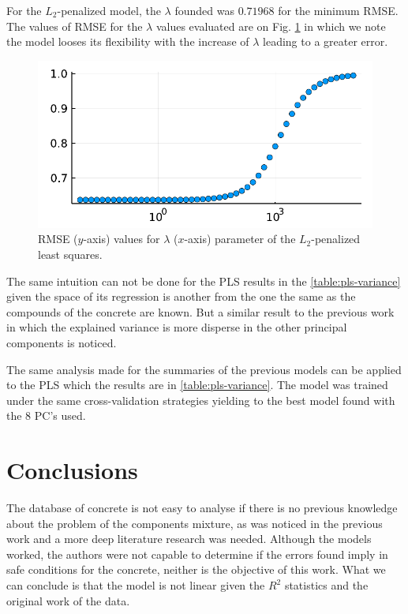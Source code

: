 \documentclass[conference]{IEEEtran}
\begin{document}
For the $L_2$-penalized model, the $\lambda$ founded was $0.71968$ for the minimum RMSE. The values of RMSE for the $\lambda$ values evaluated are on Fig. \ref{fig:L2_lambda} in which we note the model looses its flexibility with the increase of $\lambda$ leading to a greater error.
\vskip-2pt
\begin{figure}[!h] 
\centerline{\includegraphics[width=\columnwidth]{../figures/L2_lambda}}
\caption{RMSE ($y$-axis) values for $\lambda$ ($x$-axis) parameter of the $L_2$-penalized least squares.}
\label{fig:L2_lambda}
\end{figure}



The same intuition can not be done for the PLS results in the \autoref{table:pls-variance} given the space of its regression is another from the one the same as the compounds of the concrete are known. But a similar result to the previous work in which the explained variance is more disperse in the other principal components is noticed. 



The same analysis made for the summaries of the previous models can be applied to the PLS which the results are in \autoref{table:pls-variance}. The model was trained under the same cross-validation strategies yielding to the best model found with the 8 PC's used.

\section{Conclusions}\label{sec:conclusions}

The database of concrete is not easy to analyse if there is no previous knowledge about the problem of the components mixture, as was noticed in the previous work and a more deep literature research was needed. Although the models worked, the authors were not capable to determine if the errors found imply in safe conditions for the concrete, neither is the objective of this work. What we can conclude is that the model is not linear given the $R^2$ statistics and the original work of the data\cite{b4}.
\end{document}
